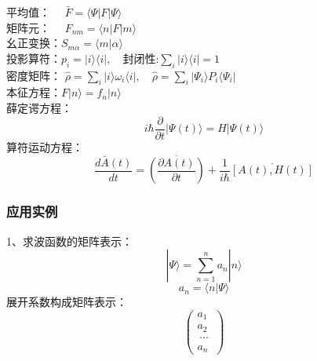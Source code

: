\begin{frame} 
    平均值：  $\hspace{1em}\bar{F} = \langle \Psi |F | \Psi \rangle$ \\ \vspace{0.2em}
    矩阵元：  $\hspace{1em}F_{nm} = \langle n |F | m \rangle$ \\ \vspace{0.2em}
    幺正变换：$S_{m\alpha} =\langle m| \alpha \rangle $ \\ \vspace{0.2em}
    投影算符：$p_i = |i\rangle\langle i |, \quad \text{封闭性:} \sum_i |i\rangle\langle i |=1 $ \\ \vspace{0.2em}
    密度矩阵： $\hat{\rho} = \sum\limits_{i}| i \rangle  \omega_i \langle i |, \quad \hat{\rho} = \sum\limits_{i}| \Psi_i \rangle  P_i \langle \Psi_i | $ \\ \vspace{0.2em}
    本征方程：$F|n\rangle =f_n |n\rangle$ \\ \vspace{0.2em}
    薛定谔方程：$$ i\hbar \frac{\partial }{\partial t} |\Psi(t)\rangle = H|\Psi(t)\rangle $$ 
    算符运动方程：$$ \frac{d\bar{A}(t)}{dt}=\overline{(\frac{\partial A(t) }{\partial t})}  +\frac{1}{i\hbar} \overline{[A(t),H(t)]}$$
\end{frame} 
 
\begin{frame} 
    \frametitle{应用实例}  
    1、求波函数的矩阵表示：  
    $$|\Psi \rangle =\sum\limits_{n=1} ^n a_n |n \rangle$$
    $$ a_n= \langle n | \Psi \rangle$$ 
    展开系数构成矩阵表示：  
    $$\begin{pmatrix}
    a_1\\
    a_2\\\
    \cdots\\
    a_n\
    \end{pmatrix} $$
\end{frame} 

